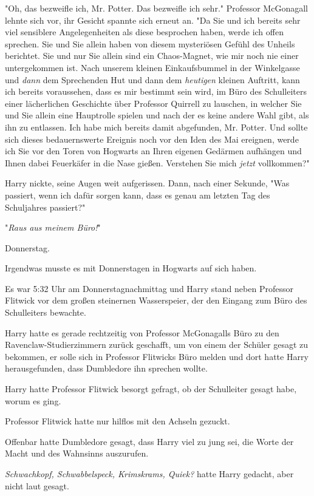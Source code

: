 {"Oh, das bezweifle ich, Mr. Potter. Das bezweifle ich sehr." Professor McGonagall lehnte sich vor, ihr Gesicht spannte sich erneut an. "Da Sie und ich bereits sehr viel sensiblere Angelegenheiten als diese besprochen haben, werde ich offen sprechen. Sie und Sie allein haben von diesem mysteriösen Gefühl des Unheils berichtet. Sie und nur Sie allein sind ein Chaos-Magnet, wie mir noch nie einer untergekommen ist. Nach unserem kleinen Einkaufsbummel in der Winkelgasse und \emph{dann} dem Sprechenden Hut und dann dem \emph{heutigen} kleinen Auftritt, kann ich bereits voraussehen, dass es mir bestimmt sein wird, im Büro des Schulleiters einer lächerlichen Geschichte über Professor Quirrell zu lauschen, in welcher Sie und Sie allein eine Hauptrolle spielen und nach der es keine andere Wahl gibt, als ihn zu entlassen. Ich habe mich bereits damit abgefunden, Mr. Potter. Und sollte sich dieses bedauernswerte Ereignis noch vor den Iden des Mai ereignen, werde ich Sie vor den Toren von Hogwarts an Ihren eigenen Gedärmen aufhängen und Ihnen dabei Feuerkäfer in die Nase gießen. Verstehen Sie mich \emph{jetzt} vollkommen?"

Harry nickte, seine Augen weit aufgerissen. Dann, nach einer Sekunde, "Was passiert, wenn ich dafür sorgen kann, dass es genau am letzten Tag des Schuljahres passiert?"

"\emph{Raus aus meinem Büro!}"

\later

Donnerstag.

Irgendwas musste es mit Donnerstagen in Hogwarts auf sich haben.

Es war 5:32 Uhr am Donnerstagnachmittag und Harry stand neben Professor Flitwick vor dem großen steinernen Wasserspeier, der den Eingang zum Büro des Schulleiters bewachte.

Harry hatte es gerade rechtzeitig von Professor McGonagalls Büro zu den Ravenclaw-Studierzimmern zurück geschafft, um von einem der Schüler gesagt zu bekommen, er solle sich in Professor Flitwicks Büro melden und dort hatte Harry herausgefunden, dass Dumbledore ihn sprechen wollte.

Harry hatte Professor Flitwick besorgt gefragt, ob der Schulleiter gesagt habe, worum es ging.

Professor Flitwick hatte nur hilflos mit den Achseln gezuckt.

Offenbar hatte Dumbledore gesagt, dass Harry viel zu jung sei, die Worte der Macht und des Wahnsinns auszurufen.

\emph{Schwachkopf, Schwabbelspeck, Krimskrams, Quiek?} hatte Harry gedacht, aber nicht laut gesagt.

}
